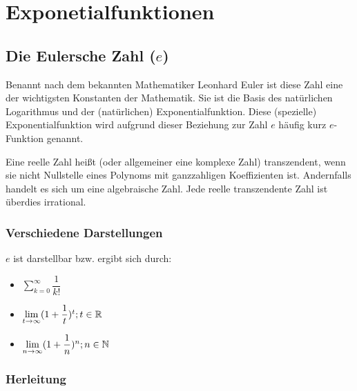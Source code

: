 \chapter{Exponetialfunktionen}

		\section{Die Eulersche Zahl ($e$)}

Benannt nach dem bekannten Mathematiker Leonhard Euler ist diese Zahl eine der wichtigsten Konstanten der Mathematik.
Sie ist die Basis des natürlichen Logarithmus und der (natürlichen) Exponentialfunktion. Diese (spezielle) Exponentialfunktion wird aufgrund dieser Beziehung zur Zahl $e$ häufig kurz $e$-Funktion genannt.
\begin{Definition}
  Eine reelle Zahl heißt (oder allgemeiner eine komplexe Zahl) transzendent,
  wenn sie nicht Nullstelle eines Polynoms mit ganzzahligen Koeffizienten ist.
  Andernfalls handelt es sich um eine algebraische Zahl. Jede reelle transzendente Zahl ist überdies irrational.
\end{Definition}

	\subsection{Verschiedene Darstellungen}

$e$ ist darstellbar bzw. ergibt sich durch:
\begin{itemize}
\item $\sum\limits_{k=0}^{\infty}$
\item $\lim\limits_{t\to \infty}(1+)^t;t\in\R$
\item $\lim\limits_{n\to \infty}(1+)^n;n\in\N$
\end{itemize}

	\subsection{Herleitung}

